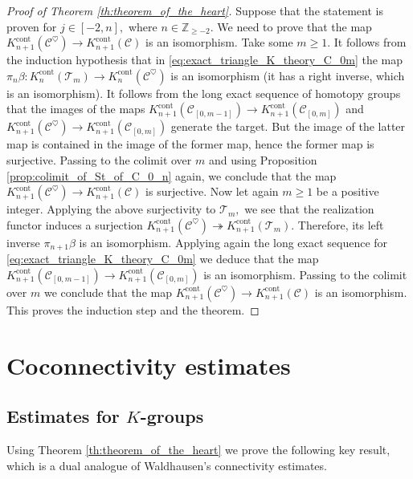 \documentclass[11pt,leqno]{amsart}
\numberwithin{equation}{section}
\def\Z{\mathbb{Z}}
\newcommand{\onto}{\twoheadrightarrow}
\newcommand{\cont}{\operatorname{cont}}
\newcommand{\cC}{{\mathcal C}}
\newcommand{\cT}{{\mathcal T}}
\begin{document}
\begin{proof}[Proof of Theorem \ref{th:theorem_of_the_heart}]
 Suppose that the statement is proven for $j\in [-2,n],$ where $n\in\Z_{\geq -2}.$ We need to prove that the map $K_{n+1}^{\cont}(\cC^{\heartsuit})\to K_{n+1}^{\cont}(\cC)$ is an isomorphism. Take some $m\geq 1.$ It follows from the induction hypothesis that in \eqref{eq:exact_triangle_K_theory_C_0m} the map $\pi_n\beta:K_n^{\cont}(\cT_m)\to K_n^{\cont}(\cC^{\heartsuit})$ is an isomorphism (it has a right inverse, which is an isomorphism). It follows from the long exact sequence of homotopy groups that the images of the maps $K_{n+1}^{\cont}(\cC_{[0,m-1]})\to K_{n+1}^{\cont}(\cC_{[0,m]})$ and $K_{n+1}^{\cont}(\cC^{\heartsuit})\to K_{n+1}^{\cont}(\cC_{[0,m]})$ generate the target. But the image of the latter map is contained in the image of the former map, hence the former map is surjective. Passing to the colimit over $m$ and using Proposition \ref{prop:colimit_of_St_of_C_0_n} again, we conclude that the map $K_{n+1}^{\cont}(\cC^{\heartsuit})\to K_{n+1}^{\cont}(\cC)$ is surjective. Now let again $m\geq 1$ be a positive integer. Applying the  above surjectivity to $\cT_m,$ we see that the realization functor induces a surjection $K_{n+1}^{\cont}(\cC^{\heartsuit})\onto K_{n+1}^{\cont}(\cT_m).$ Therefore, its left inverse $\pi_{n+1}\beta$ is an isomorphism. Applying again the long exact sequence for \eqref{eq:exact_triangle_K_theory_C_0m} we deduce that the map $K_{n+1}^{\cont}(\cC_{[0,m-1]})\to K_{n+1}^{\cont}(\cC_{[0,m]})$ is an isomorphism. Passing to the colimit over $m$ we conclude that the map $K_{n+1}^{\cont}(\cC^{\heartsuit})\to K_{n+1}^{\cont}(\cC)$ is an isomorphism. This proves the induction step and the theorem.
\end{proof}

\section{Coconnectivity estimates}
\label{sec:coconnectivity_estimates}

\subsection{Estimates for $K$-groups}

Using Theorem \ref{th:theorem_of_the_heart} we prove the following key result, which is a dual analogue of Waldhausen's connectivity estimates.
\end{document}
